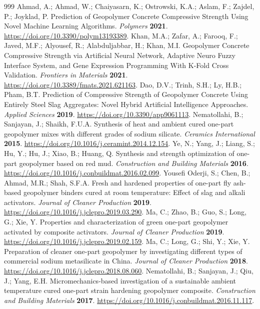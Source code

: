 \documentclass[materials,article,submit,pdftex,moreauthors]{Definitions/mdpi}
\begin{document}
\begin{thebibliography}{999}
Ahmad, A.; Ahmad, W.; Chaiyasarn, K.; Ostrowski, K.A.; Aslam, F.; Zajdel, P.; Joyklad, P. Prediction of Geopolymer Concrete Compressive Strength Using Novel Machine Learning Algorithms. {\em Polymers} {\bf 2021}. \url{https://doi.org/10.3390/polym13193389}.
Khan, M.A.; Zafar, A.; Farooq, F.; Javed, M.F.; Alyousef, R.; Alabduljabbar, H.; Khan, M.I. Geopolymer Concrete Compressive Strength via Artificial Neural Network, Adaptive Neuro Fuzzy Interface System, and Gene Expression Programming With K-Fold Cross Validation. {\em Frontiers in Materials} {\bf 2021}. \url{https://doi.org/10.3389/fmats.2021.621163}.
Dao, D.V.; Trinh, S.H.; Ly, H.B.; Pham, B.T. Prediction of Compressive Strength of Geopolymer Concrete Using Entirely Steel Slag Aggregates: Novel Hybrid Artificial Intelligence Approaches. {\em Applied Sciences} {\bf 2019}. \url{https://doi.org/10.3390/app9061113}.
Nematollahi, B.; Sanjayan, J.; Shaikh, F.U.A. Synthesis of heat and ambient cured one-part geopolymer mixes with different grades of sodium silicate. {\em Ceramics International} {\bf 2015}. \url{https://doi.org/10.1016/j.ceramint.2014.12.154}.
Ye, N.; Yang, J.; Liang, S.; Hu, Y.; Hu, J.; Xiao, B.; Huang, Q. Synthesis and strength optimization of one-part geopolymer based on red mud. {\em Construction and Building Materials} {\bf 2016}. \url{https://doi.org/10.1016/j.conbuildmat.2016.02.099}.
Yousefi Oderji, S.; Chen, B.; Ahmad, M.R.; Shah, S.F.A. Fresh and hardened properties of one-part fly ash-based geopolymer binders cured at room temperature: Effect of slag and alkali activators. {\em Journal of Cleaner Production} {\bf 2019}. \url{https://doi.org/10.1016/j.jclepro.2019.03.290}.
Ma, C.; Zhao, B.; Guo, S.; Long, G.; Xie, Y. Properties and characterization of green one-part geopolymer activated by composite activators. {\em Journal of Cleaner Production} {\bf 2019}. \url{https://doi.org/10.1016/j.jclepro.2019.02.159}.
Ma, C.; Long, G.; Shi, Y.; Xie, Y. Preparation of cleaner one-part geopolymer by investigating different types of commercial sodium metasilicate in China. {\em Journal of Cleaner Production} {\bf 2018}. \url{https://doi.org/10.1016/j.jclepro.2018.08.060}.
Nematollahi, B.; Sanjayan, J.; Qiu, J.; Yang, E.H. Micromechanics-based investigation of a sustainable ambient temperature cured one-part strain hardening geopolymer composite. {\em Construction and Building Materials} {\bf 2017}. \url{https://doi.org/10.1016/j.conbuildmat.2016.11.117}.

\end{thebibliography}
\end{document}
